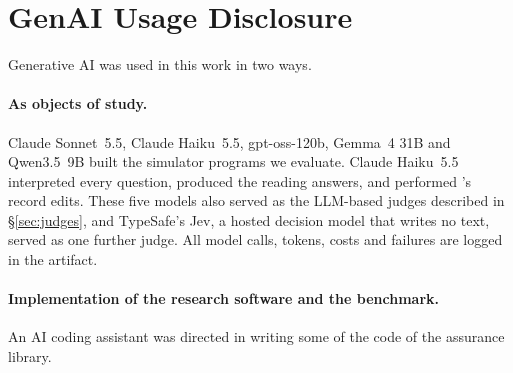 \section*{GenAI Usage Disclosure}

Generative AI was used in this work in two ways.

\paragraph{As objects of study.} Claude Sonnet~5.5, Claude Haiku~5.5, gpt-oss-120b, Gemma~4 31B and Qwen3.5~9B built the simulator programs we evaluate. Claude Haiku~5.5 interpreted every question, produced the reading answers, and performed \otf's record edits. These five models also served as the LLM-based judges described in \S\ref{sec:judges}, and TypeSafe's Jev, a hosted decision model that writes no text, served as one further judge. All model calls, tokens, costs and failures are logged in the artifact.

\paragraph{Implementation of the research software and the benchmark.} An AI coding assistant was directed in writing some of the code of the assurance library.
